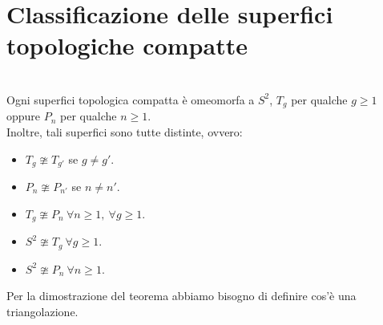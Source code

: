\section{Classificazione delle superfici topologiche compatte}
\begin{theorema}~{}\label{classificazionesuperficicompatte}\\
Ogni superfici topologica compatta è omeomorfa a $S^2$, $T_g$ per qualche $g\geq 1$ oppure $P_n$ per qualche $n\geq 1$.\\
Inoltre, tali superfici sono tutte distinte, ovvero:
\begin{itemize}
	\item $T_g\ncong T_{g'}$ se $g\neq g'$.
	\item $P_n\ncong P_{n'}$ se $n\neq n'$.
	\item $T_g\ncong P_{n}\ \forall n\geq 1,\ \forall g\geq 1$.
	\item $S^2\ncong T_g\ \forall g\geq 1$.
	\item $S^2\ncong P_n\ \forall n\geq 1$.
\end{itemize}
\vspace{-3mm}
\end{theorema}
Per la dimostrazione del teorema abbiamo bisogno di definire cos'è una triangolazione.
